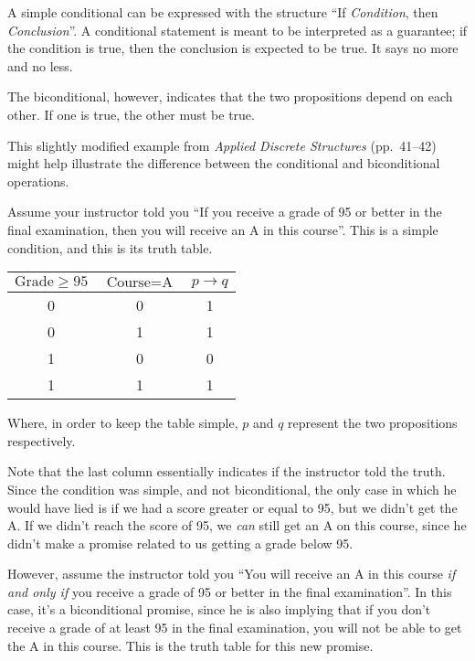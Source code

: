 \documentclass{article}
\begin{document}
A simple conditional can be expressed with the structure ``If
\textit{Condition}, then \textit{Conclusion}''. A conditional statement is meant
to be interpreted as a guarantee; if the condition is true, then the conclusion
is expected to be true. It says no more and no less.

The biconditional, however, indicates that the two propositions depend on each
other. If one is true, the other must be true.

This slightly modified example from \textit{Applied Discrete Structures}
(pp.~41--42) might help illustrate the difference between the conditional and
biconditional operations.

Assume your instructor told you ``If you receive a grade of 95 or better in the
final examination, then you will receive an A in this course''. This is a simple
condition, and this is its truth table.

\medskip
\begin{center}
  \begin{tabular}{| c | c | c |}
    \hline
    $\text{Grade} \geq 95$ & $\text{Course} = \text{A}$ & $p \to q$ \\
    \hline
    0 & 0 & 1 \\
    0 & 1 & 1 \\
    1 & 0 & 0 \\
    1 & 1 & 1 \\
    \hline
  \end{tabular}
\end{center}
\medskip

Where, in order to keep the table simple, $p$ and $q$ represent the two
propositions respectively.

Note that the last column essentially indicates if the instructor told the
truth. Since the condition was simple, and not biconditional, the only case in
which he would have lied is if we had a score greater or equal to 95, but we
didn't get the A. If we didn't reach the score of 95, we \textit{can} still get
an A on this course, since he didn't make a promise related to us getting a
grade below 95.

However, assume the instructor told you ``You will receive an A in this course
\textit{if and only if} you receive a grade of 95 or better in the final
examination''. In this case, it's a biconditional promise, since he is also
implying that if you don't receive a grade of at least 95 in the final
examination, you will not be able to get the A in this course. This is the truth
table for this new promise.
\end{document}

